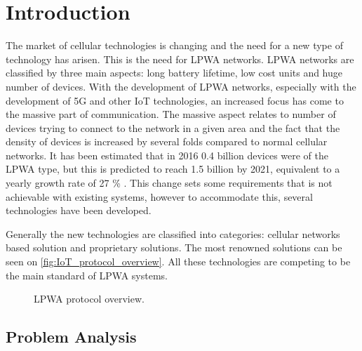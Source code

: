 \chapter{Introduction}\label{ch:Introduction}




The market of cellular technologies is changing and the need for a new type of technology has arisen. This is the need for \gls{LPWA} networks. \gls{LPWA} networks are classified by three main aspects: long battery lifetime, low cost units and huge number of devices. With the development of \gls{LPWA} networks, especially with the development of 5G and other \gls{IoT} technologies, an increased focus has come to the massive part of communication. The massive aspect relates to number of devices trying to connect to the network in a given area and the fact that the density of devices is increased by several folds compared to normal cellular networks. It has been estimated that in 2016 0.4 billion devices were of the \gls{LPWA} type, but this is predicted to reach 1.5 billion by 2021, equivalent to a yearly growth rate of 27 \% \citep{mobi-report}. This change sets some requirements that is not achievable with existing systems, however to accommodate this, several technologies have been developed.


Generally the new technologies are classified into categories: cellular networks based solution and proprietary solutions. The most renowned solutions can be seen on \autoref{fig:IoT_protocol_overview}. All these technologies are competing to be the main standard of LPWA systems. 

\begin{figure}[H]
\centering
\caption{LPWA protocol overview.}
\label{fig:IoT_protocol_overview}
\end{figure}



\section{Problem Analysis}

